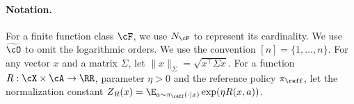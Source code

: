 \paragraph{Notation.} For a finite function class $\cF$, we use $N_\cF$ to represent its cardinality. We use $\widetilde{\cO}$ to omit the logarithmic orders. We use the convention $[n]=\{1,\ldots,n\}$. For any vector $x$ and a matrix $\Sigma$, let $\|x\|_\Sigma=\sqrt{x^{\top}\Sigma x}$. For a function $R:\cX\times\cA\rightarrow\RR$, parameter $\eta>0$ and the reference policy $\pi_{\reff}$, let the normalization constant $Z_R(x)=\E_{a \sim \pi_{\reff}(\cdot|x)} \exp (\eta R(x,a))$.